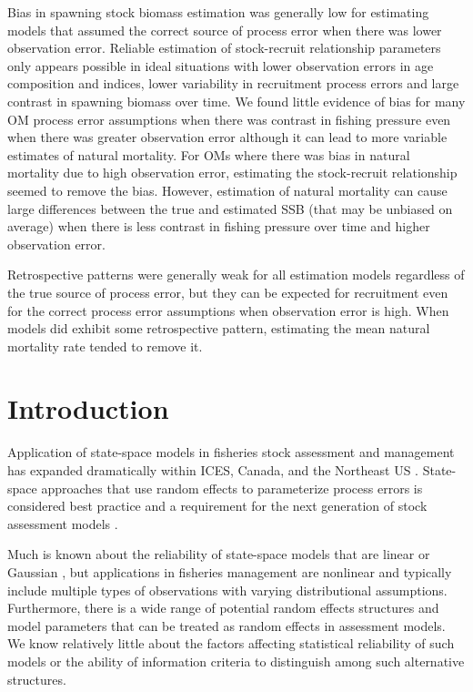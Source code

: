 \documentclass[
  12pt,
]{article}
\begin{document}
Bias in spawning stock biomass estimation was generally low for
estimating models that assumed the correct source of process error when
there was lower observation error. Reliable estimation of stock-recruit
relationship parameters only appears possible in ideal situations with
lower observation errors in age composition and indices, lower
variability in recruitment process errors and large contrast in spawning
biomass over time. We found little evidence of bias for many OM process
error assumptions when there was contrast in fishing pressure even when
there was greater observation error although it can lead to more
variable estimates of natural mortality. For OMs where there was bias in
natural mortality due to high observation error, estimating the
stock-recruit relationship seemed to remove the bias. However,
estimation of natural mortality can cause large differences between the
true and estimated SSB (that may be unbiased on average) when there is
less contrast in fishing pressure over time and higher observation
error.

Retrospective patterns were generally weak for all estimation models
regardless of the true source of process error, but they can be expected
for recruitment even for the correct process error assumptions when
observation error is high. When models did exhibit some retrospective
pattern, estimating the mean natural mortality rate tended to remove it.

\pagebreak

\hypertarget{introduction}{%
\section*{Introduction}\label{introduction}}

Application of state-space models in fisheries stock assessment and
management has expanded dramatically within ICES, Canada, and the
Northeast US \citep{nielsenberg14,cadigan16,stockmiller21}. State-space
approaches that use random effects to parameterize process errors is
considered best practice and a requirement for the next generation of
stock assessment models \citep{hoyleetal22, punt23}.

Much is known about the reliability of state-space models that are
linear or Gaussian \citep{aeberhardetal18}, but applications in
fisheries management are nonlinear and typically include multiple types
of observations with varying distributional assumptions. Furthermore,
there is a wide range of potential random effects structures and model
parameters that can be treated as random effects in assessment models.
We know relatively little about the factors affecting statistical
reliability of such models or the ability of information criteria to
distinguish among such alternative structures.
\end{document}
